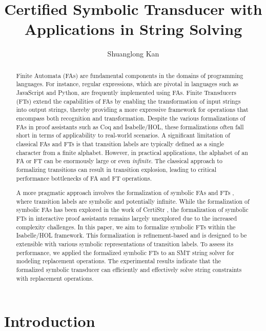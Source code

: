 \documentclass[a4paper,UKenglish,cleveref, autoref, thm-restate]{lipics-v2021}
\title{Certified Symbolic Transducer with Applications in String Solving} %
\author{Shuanglong Kan}{Barkhausen Institut, Germany \and \url{https://github.com/ShlKan} }{shuanglongkan@gmail.com}{https://orcid.org/0000-0002-1825-0097}{(Optional) author-specific funding acknowledgements}%
\begin{document}
\maketitle

\begin{abstract}
Finite Automata (FAs) are fundamental components in the domains of programming languages. For instance, regular expressions, which are pivotal in languages such as JavaScript and Python, are frequently implemented using FAs.
%
Finite Transducers (FTs) extend the capabilities of FAs by enabling the transformation of input strings into output strings, thereby providing a more expressive framework for operations that encompass both recognition and transformation. Despite the various formalizations of FAs in proof assistants such as Coq and Isabelle/HOL, these formalizations often fall short in terms of applicability to real-world scenarios. A significant limitation of classical FAs and FTs is that transition labels are typically defined as a single character from a finite alphabet. However, in practical applications, the alphabet of an FA or FT can be enormously large or even \emph{infinite}. The classical approach to formalizing transitions can result in transition explosion, leading to critical performance bottlenecks of FA and FT operations.

A more pragmatic approach involves the formalization of symbolic FAs \cite{cav/DAntoniV17} and FTs \cite{VeanesHLMB12Transducer}, where transition labels are symbolic and potentially infinite. While the formalization of symbolic FAs has been explored in the work of CertiStr \cite{cpp/KanLRS22}, the formalization of symbolic FTs in interactive proof assistants remains largely unexplored due to the increased complexity challenges.
%
In this paper, we aim to formalize symbolic FTs within the Isabelle/HOL framework. This formalization is refinement-based and is designed to be extensible with various symbolic representations of transition labels. To assess its performance, we applied the formalized symbolic FTs to an SMT string solver for modeling replacement operations. The experimental results indicate that the formalized symbolic transducer can efficiently and effectively solve string constraints with replacement operations.


\end{abstract}

\section{Introduction}
\label{sec:introduction}
\end{document}

